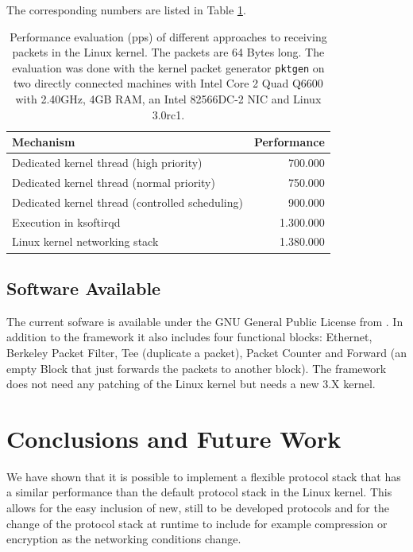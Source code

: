 \documentclass{sig-alternate}
\begin{document}
The corresponding numbers are listed in Table \ref{tab:performance}.
\begin{table}[htb]
\begin{tabular}{ l r }
Mechanism & Performance\\
\hline
Dedicated kernel thread (high priority) & 700.000\\
Dedicated kernel thread (normal priority) & 750.000\\
Dedicated kernel thread (controlled scheduling) & 900.000\\
Execution in ksoftirqd & 1.300.000\\
Linux kernel networking stack & 1.380.000\\
\end{tabular}
\caption{Performance evaluation (pps) of different approaches to receiving 
packets in the Linux kernel. The packets are 64 Bytes long. The evaluation 
was done with the kernel packet generator \texttt{pktgen} on two directly 
connected machines with Intel Core 2 Quad Q6600 with 2.40GHz, 4GB RAM, an 
Intel 82566DC-2 NIC and Linux 3.0rc1.}
\label{tab:performance}
\end{table}

\subsection{Software Available}
The current sofware is available under the GNU General Public License from 
\cite{lana}. In addition to the framework it also includes four functional 
blocks: Ethernet, Berkeley Packet Filter, Tee (duplicate a packet), Packet 
Counter and Forward (an empty Block that just forwards the packets to 
another block). The framework does not need any patching of the Linux kernel
but needs a new 3.X kernel.

\section{Conclusions and Future Work}
We have shown that it is possible to implement a flexible protocol stack that has a similar performance than the default protocol stack in the Linux kernel. This allows for the easy inclusion of new, still to be developed protocols and for the change of the protocol stack at runtime to include for example compression or encryption as the networking conditions change. 
\end{document}
